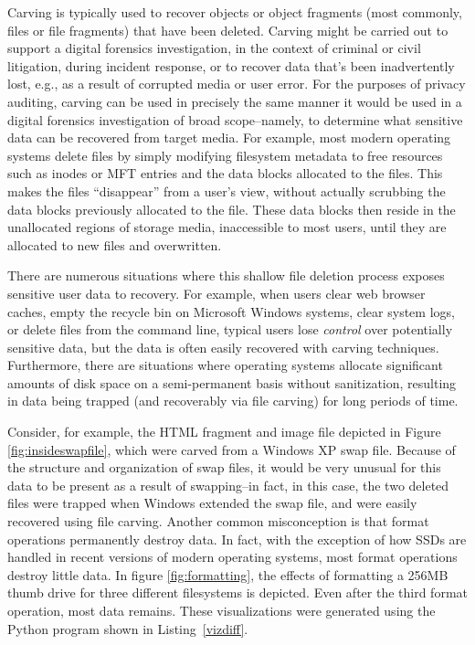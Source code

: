 Carving is typically used to recover objects or object fragments (most
commonly, files or file fragments) that have been deleted.  Carving
might be carried out to support a digital forensics investigation, in
the context of criminal or civil litigation, during incident response,
or to recover data that's been inadvertently lost, e.g., as a result
of corrupted media or user error.  For the purposes of privacy
auditing, carving can be used in precisely the same manner it would be
used in a digital forensics investigation of broad scope--namely, to
determine what sensitive data can be recovered from target media.  For
example, most modern operating systems delete files by simply
modifying filesystem metadata to free resources such as inodes or MFT
entries and the data blocks allocated to the files.  This makes the
files ``disappear'' from a user's view, without actually scrubbing the
data blocks previously allocated to the file.  These data blocks then
reside in the unallocated regions of storage media, inaccessible to
most users, until they are allocated to new files and overwritten.

There are numerous situations where this shallow file deletion process
exposes sensitive user data to recovery.  For example, when users
clear web browser caches, empty the recycle bin on Microsoft Windows
systems, clear system logs, or delete files from the command line,
typical users lose \emph{control} over potentially sensitive data, but
the data is often easily recovered with carving techniques.
Furthermore, there are situations where operating systems allocate
significant amounts of disk space on a semi-permanent basis without
sanitization, resulting in data being trapped (and recoverably via
file carving) for long periods of time.

Consider, for example, the HTML fragment and image file depicted in
Figure \ref{fig:insideswapfile}, which were carved from a Windows XP
swap file.  Because of the structure and organization of swap files,
it would be very unusual for this data to be present as a result of
swapping--in fact, in this case, the two deleted files were trapped
when Windows extended the swap file, and were easily recovered using
file carving.  Another common misconception is that format operations
permanently destroy data.  In fact, with the exception of how SSDs are
handled in recent versions of modern operating systems, most format
operations destroy little data.  In figure \ref{fig:formatting}, the
effects of formatting a 256MB thumb drive for three different
filesystems is depicted.  Even after the third format operation, most
data remains.  These visualizations were generated using the Python program
shown in Listing~\ref{vizdiff}. 

